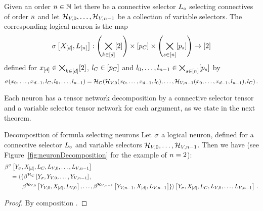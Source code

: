 \begin{definition}\label{def:fsNeuron}
	Given an order $n\in\mathbb{N}$ let there be a connective selector $L_{\circ}$ selecting connectives of order $n$ and let $\mathcal{H}_{V,0},\ldots,\mathcal{H}_{V,n-1}$ be a collection of variable selectors.
	The corresponding logical neuron is the map
	\begin{align*}
		\sigma\left[X_{[d]},L_{[n]}\right] 
		: \left(\bigtimes_{k\in[d]}[2]\right) \times [p_{C}] \times \left( \bigtimes_{s\in[n]} [p_{s}]\right) \rightarrow [2] 
	\end{align*}
	defined for $x_{[d]}\in\bigtimes_{k\in[d]}[2]$, $l_{C}\in[p_{C}]$ and
	$l_{0},\ldots,l_{n-1}\in \bigtimes_{s\in[n]} [p_{s}]$ by
	\begin{align*}
		\sigma({x_{0},\ldots,x_{d-1}}, l_{C}, l_{0},\ldots,l_{n-1}) =
		\mathcal{H}_{C}(\mathcal{H}_{V,0}({x_{0},\ldots,x_{d-1}}, l_{0}),\ldots,\mathcal{H}_{V,n-1}({x_{0},\ldots,x_{d-1}},l_{n-1}), l_{C}) \, .
	\end{align*}
\end{definition}

Each neuron has a tensor network decomposition by a connective selector tensor and a variable selector tensor network for each argument, as we state in the next theorem.

\begin{theorem}{Decomposition of formula selecting neurons}\label{the:neuronDecomposition}
	Let $\sigma$ a logical neuron, defined for a connective selector $L_{\circ}$ and variable selectors $\mathcal{H}_{V,0},\ldots,\mathcal{H}_{V,n-1}$.
	Then we have (see Figure~\ref{fig:neuronDecomposition} for the example of $n=2$):
	\begin{align*}
		&\beta^{\sigma}\left[Y_{\sigma},X_{[d]},L_{C},L_{V,0},\ldots,L_{V,n-1}\right] \\
		&\quad = \langle\{\beta^{\mathcal{H}_{C}}\left[
				Y_{\sigma},Y_{V,0},\ldots,Y_{V,n-1}\right], \\
		& \quad\quad\quad\beta^{\mathcal{H}_{V,0}}\left[
				Y_{V,0},X_{[d]},L_{V,0}\right],\ldots,
				\beta^{\mathcal{H}_{V,n-1}}\left[
					Y_{V,n-1},X_{[d]},L_{V,n-1}\right]
				\} \rangle
		\left[Y_{\sigma},X_{[d]}, L_{C},L_{V,0},\ldots,L_{V,n-1}\right] \, .
	\end{align*}
\end{theorem}
\begin{proof}
	By composition .
\end{proof}


